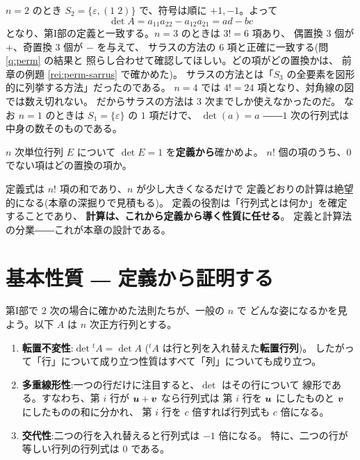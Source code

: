 \begin{rei}[$2$ 次・$3$ 次との一致]\label{rei:gendet-agree}
$n = 2$ のとき $S_2 = \{\varepsilon, (1\;2)\}$ で、符号は順に $+1, -1$。よって
\[
\det A = a_{11}a_{22} - a_{12}a_{21} = ad - bc
\]
となり、第I部の定義と一致する。$n = 3$ のときは $3! = 6$ 項あり、
偶置換 $3$ 個が $+$、奇置換 $3$ 個が $-$ を与えて、
サラスの方法の $6$ 項と正確に一致する(問 \ref{q:perm} の結果と
照らし合わせて確認してほしい。どの項がどの置換かは、
前章の例題 \ref{rei:perm-sarrus} で確かめた)。
サラスの方法とは「$S_3$ の全要素を図形的に列挙する方法」だったのである。
$n = 4$ では $4! = 24$ 項となり、対角線の図では数え切れない。
だからサラスの方法は $3$ 次までしか使えなかったのだ。
なお $n = 1$ のときは $S_1 = \{\varepsilon\}$ の $1$ 項だけで、
$\det(a) = a$ ――$1$ 次の行列式は中身の数そのものである。
\end{rei}

\begin{mondai}\label{q:gendet-E}
$n$ 次単位行列 $E$ について $\det E = 1$ を\textbf{定義から}確かめよ。
$n!$ 個の項のうち、$0$ でない項はどの置換の項か。
\end{mondai}

\begin{chui}
定義式は $n!$ 項の和であり、$n$ が少し大きくなるだけで
定義どおりの計算は絶望的になる(本章の深掘りで見積もる)。
定義の役割は「行列式とは何か」を確定することであり、
\textbf{計算は、これから定義から導く性質に任せる}。
定義と計算法の分業――これが本章の設計である。
\end{chui}

\section{基本性質 ― 定義から証明する}

第I部で $2$ 次の場合に確かめた法則たちが、一般の $n$ で
どんな姿になるかを見よう。以下 $A$ は $n$ 次正方行列とする。

\begin{teiri}[基本性質]\label{thm:det-props}
\begin{enumerate}
\item \textbf{転置不変性}:$\det {}^t\!A = \det A$
(${}^t\!A$ は行と列を入れ替えた\textbf{転置行列})。
したがって「行」について成り立つ性質はすべて「列」についても成り立つ。
\item \textbf{多重線形性}:一つの行だけに注目すると、$\det$ はその行について
線形である。すなわち、第 $i$ 行が $\bm{u} + \bm{v}$ なら行列式は
第 $i$ 行を $\bm{u}$ にしたものと $\bm{v}$ にしたものの和に分かれ、
第 $i$ 行を $c$ 倍すれば行列式も $c$ 倍になる。
\item \textbf{交代性}:二つの行を入れ替えると行列式は $-1$ 倍になる。
特に、二つの行が等しい行列の行列式は $0$ である。
\end{enumerate}
\end{teiri}

